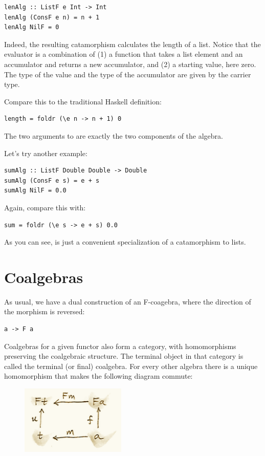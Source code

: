 \begin{verbatim}
lenAlg :: ListF e Int -> Int
lenAlg (ConsF e n) = n + 1
lenAlg NilF = 0
\end{verbatim}
Indeed, the resulting catamorphism  calculates the
length of a list. Notice that the evaluator is a combination of (1) a
function that takes a list element and an accumulator and returns a new
accumulator, and (2) a starting value, here zero. The type of the value
and the type of the accumulator are given by the carrier type.

Compare this to the traditional Haskell definition:

\begin{verbatim}
length = foldr (\e n -> n + 1) 0
\end{verbatim}
The two arguments to  are exactly the two components of
the algebra.

Let's try another example:

\begin{verbatim}
sumAlg :: ListF Double Double -> Double
sumAlg (ConsF e s) = e + s
sumAlg NilF = 0.0
\end{verbatim}
Again, compare this with:

\begin{verbatim}
sum = foldr (\e s -> e + s) 0.0
\end{verbatim}
As you can see,  is just a convenient specialization of a
catamorphism to lists.

\section{Coalgebras}\label{coalgebras}

As usual, we have a dual construction of an F-coagebra, where the
direction of the morphism is reversed:

\begin{verbatim}
a -> F a
\end{verbatim}
Coalgebras for a given functor also form a category, with homomorphisms
preserving the coalgebraic structure. The terminal object
 in that category is called the terminal (or final)
coalgebra. For every other algebra  there is a unique
homomorphism  that makes the following diagram commute:

\begin{figure}[H]
\centering
\includegraphics[width=50mm]{images/alg7.png}
\end{figure}

